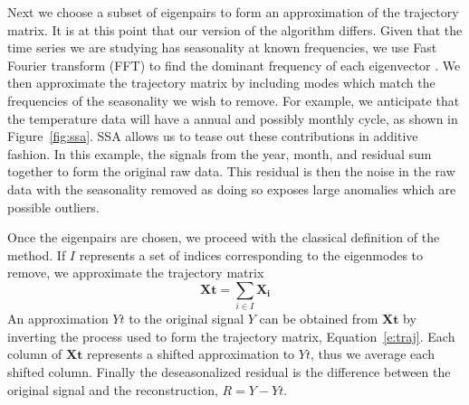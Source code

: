 \documentclass[letterpaper, 10 pt, conference]{ieeeconf}  %
\begin{document}
Next we choose a subset of eigenpairs to form an approximation of the trajectory matrix. It is at this point that our version of the algorithm differs. Given that the time series we are studying has seasonality at known frequencies, we use Fast Fourier transform (FFT) to find the dominant frequency of each eigenvector \cite{cooley1965algorithm}. We then approximate the trajectory matrix by including modes which match the frequencies of the seasonality we wish to remove. For example, we anticipate that the temperature data will have a annual and possibly monthly cycle, as shown in Figure~\ref{fig:ssa}. SSA allows us to tease out these contributions in additive fashion. In this example, the signals from the year, month, and residual sum together to form the original raw data. This residual is then the noise in the raw data with the seasonality removed as doing so exposes large anomalies which are possible outliers. %

%

Once the eigenpairs are chosen, we proceed with the classical definition of the method. If $I$ represents a set of indices corresponding to the eigenmodes to remove, we approximate the trajectory matrix
%
\begin{equation*}
    \mathbf{Xt} = \sum_{i\in I} \mathbf{X_i}
\end{equation*}
%
An approximation $Yt$ to the original signal $Y$ can be obtained from $\mathbf{Xt}$ by inverting the process used to form the trajectory matrix, Equation~\eqref{e:traj}. Each column of $\mathbf{Xt}$ represents a shifted approximation to $Yt$, thus we average each shifted column. Finally the deseasonalized residual is the difference between the original signal and the reconstruction, $R=Y-Yt$.
\end{document}
